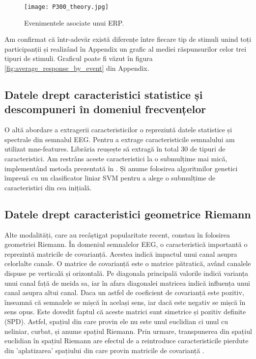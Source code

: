 \vspace{1em}
\begin{figure}[H]
    \centering
		\vspace{-1em}
    \texttt{[image: P300\_theory.jpg]}
    \caption{Evenimentele asociate unui ERP\cite{P300_image}.}
		\vspace{-1em}
    \label{fig:enter-label}
\end{figure}

Am confirmat că într-adevăr există diferențe între fiecare tip de stimuli unind toți participanții și realizând în Appendix un grafic al mediei răspunsurilor celor trei tipuri de stimuli. Graficul poate fi văzut în figura \ref{fig:average_response_by_event} din Appendix.

\subsection{Datele drept caracteristici statistice și descompuneri în domeniul frecvențelor}

O altă abordare a extragerii caracteristicilor o reprezintă datele statistice și spectrale din semnalul EEG. Pentru a extrage caracteristicile semnalului am utilizat mne-features\cite{mne-features}. Librăria reușește să extragă în total 30 de tipuri de caracteristici. Am restrâns aceste caracteristici la o submulțime mai mică, implementând metoda prezentată în \cite{ga_svm}. Și anume folosirea algoritmilor genetici împreuă cu un clasificator liniar SVM pentru a alege o submulțime de caracteristici din cea inițială. 

\subsection{Datele drept caracteristici geometrice Riemann}
Alte modalități, care au recâștigat popularitate recent, constau în folosirea geometriei Riemann. În domeniul semnalelor EEG, o caracteristică importantă o reprezintă matricile de covarianță. Acestea indică impactul unui canal asupra celorlalte canale. O matrice de covarianță este o matrice pătratică, având canalele dispuse pe verticală și orizontală. Pe diagonala principală valorile indică varianța unui canal față de meida sa, iar în afara diagonalei matricea indică influența unui canal asupra altui canal. Daca un astfel de coeficient de covarianță este pozitiv, înseamnă că semnalele se mișcă în același sens, iar dacă este negativ se mișcă în sens opus. Este dovedit faptul că aceste matrici sunt simetrice și pozitiv definite (SPD). Astfel, spațiul din care provin ele nu este unul euclidian ci unul cu neliniar, curbat, și anume spațiul Riemann. Prin urmare, transpunerea din spațiul euclidian în spațiul Riemann are efectul de a reintroduce caracteristicile pierdute din 'aplatizarea' spațiului din care provin matricile de covarianță \cite{riemann_geometry}.

